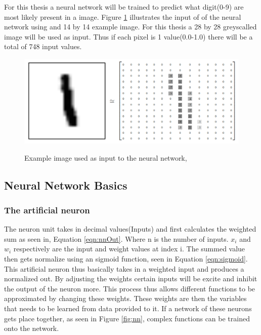For this thesis a neural network will be trained to predict what digit(0-9) are most likely present in a image.  Figure \ref{fig:mnist} illustrates the input of of the neural network using and 14 by 14 example image. For this thesis a 28 by 28 greyscalled image will be used as input. Thus if each pixel is 1 value(0.0-1.0) there will be a total of 748 input values. 

\begin{figure}
  \centering
  \includegraphics[width=14cm]{MNIST}\\
  \caption{Example image used as input to the neural network, \citet{tensor2017}}%
  \label{fig:mnist}
\end{figure}



\subsection{Neural Network Basics}

\subsubsection{The artificial neuron}

The neuron unit takes in decimal values(Inputs) and first calculates the weighted sum as seen in, Equation \ref{eqn:nnOut}.  Where n is the number of inputs. $x_{i}$ and $w_{i}$ respectively are the input and weight values at index i. The summed value then gets normalize using an sigmoid function, seen in Equation \ref{eqn:sigmoid}. This artificial neuron thus basically takes in a weighted input and produces a normalized out. By adjusting the weights certain inputs will be excite and inhibit the output of the neuron more. This process thus allows different functions to be approximated by changing these weights. These weights are then the variables that needs to be learned from data provided to it. If a network of these neurons gets place together, as seen in Figure \ref{fig:nn}, complex functions can be trained onto the network.

